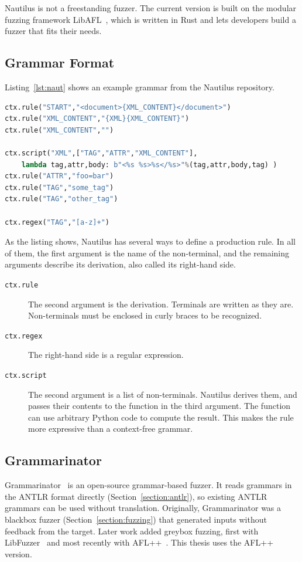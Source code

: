 \documentclass[thesis]{plai}
\begin{document}
Nautilus is not a freestanding fuzzer. The current version is built on the modular fuzzing framework LibAFL~\cite{libafl-github}, which is written in Rust and lets developers build a fuzzer that fits their needs.

\subsection{Grammar Format}
Listing~\ref{lst:naut} shows an example grammar from the Nautilus repository.

\begin{lstlisting}[caption={Example of a Nautilus grammar~\cite{nautilus-github}.}, label={lst:naut}, language=Python]
ctx.rule("START","<document>{XML_CONTENT}</document>")
ctx.rule("XML_CONTENT","{XML}{XML_CONTENT}")
ctx.rule("XML_CONTENT","")

ctx.script("XML",["TAG","ATTR","XML_CONTENT"],
    lambda tag,attr,body: b"<%s %s>%s</%s>"%(tag,attr,body,tag) )
ctx.rule("ATTR","foo=bar")
ctx.rule("TAG","some_tag")
ctx.rule("TAG","other_tag")

ctx.regex("TAG","[a-z]+")
\end{lstlisting}

As the listing shows, Nautilus has several ways to define a production rule. In all of them, the first argument is the name of the non-terminal, and the remaining arguments describe its derivation, also called its right-hand side.

\begin{description}
    \item[\texttt{ctx.rule}] The second argument is the derivation. Terminals are written as they are. Non-terminals must be enclosed in curly braces to be recognized.
    \item[\texttt{ctx.regex}] The right-hand side is a regular expression.
    \item[\texttt{ctx.script}] The second argument is a list of non-terminals. Nautilus derives them, and passes their contents to the function in the third argument. The function can use arbitrary Python code to compute the result. This makes the rule more expressive than a context-free grammar.
\end{description}


\subsection{Grammarinator}
\label{section:grammarinator}
Grammarinator~\cite{hodovan18-grammarinator} is an open-source grammar-based fuzzer. It reads grammars in the ANTLR format directly (Section~\ref{section:antlr}), so existing ANTLR grammars can be used without translation. Originally, Grammarinator was a blackbox fuzzer (Section~\ref{section:fuzzing}) that generated inputs without feedback from the target. Later work added greybox fuzzing, first with LibFuzzer~\cite{hodovan25-grammarinator-libfuzzer} and most recently with AFL++~\cite{hodovan26-grammarinator-aflpp}. This thesis uses the AFL++ version.
\end{document}
